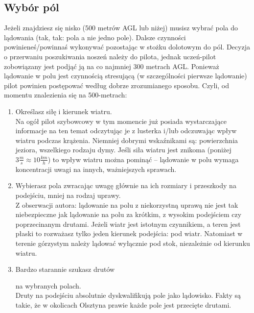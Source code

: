 \documentclass{article}
\begin{document}
\subsection{Wybór pól}
Jeżeli znajdziesz się nisko (500 metrów AGL lub niżej) musisz wybrać pola
do lądowania (tak, tak: pola a nie jedno pole).
Dalsze czynności powinieneś/powinnaś
wykonywać pozostając w stożku dolotowym do pól. Decyzja o przerwaniu
poszukiwania noszeń należy do pilota, jednak uczeń-pilot zobowiązany jest
podjąć ją na co najmniej 300 metrach AGL. Ponieważ lądowanie w polu 
jest czynnością stresującą (w szczególności pierwsze lądowanie)
pilot powinien postępować według dobrze zrozumianego
sposobu. Czyli, od momentu znalezienia się na 500-metrach:
\begin{enumerate}
\item Określasz siłę i kierunek wiatru. \\
    Na ogół pilot szybowcowy w tym momencie już posiada
    wystarczające informacje na ten temat odczytując je z lusterka i/lub
    odczuwając wpływ wiatru podczas krążenia. Niemniej dobrymi wskaźnikami są:
    powierzchnia jeziora, wszelkiego rodzaju dymy. Jeśli siła wiatru jest
    znikoma (poniżej $3\frac{m}{s} \approx 10\frac{km}{h}$) to wpływ
    wiatru można pominąć -- lądowanie w polu wymaga koncentracji uwagi
    na innych, ważniejszych sprawach.

\item Wybierasz pola zwracając uwagę głównie na ich rozmiary i przeszkody na
    podejściu, mniej na rodzaj uprawy.\\
    Z obserwacji autora: lądowanie
    na polu z niekorzystną uprawą nie jest tak niebezpieczne jak lądowanie
    na polu za krótkim, z wysokim podejściem czy poprzecinanym drutami.
    Jeżeli wiatr jest istotnym czynnikiem, a teren jest płaski
    to rozważasz tylko jeden kierunek podejścia: pod wiatr. Natomiast
    w terenie górzystym należy lądować wyłącznie pod stok, niezależnie
    od kierunku wiatru.

\item \begin{bf}Bardzo starannie szukasz drutów\end{bf} na wybranych
    polach.\\
    Druty na podejściu absolutnie dyskwalifikują pole jako lądowisko.
    Fakty są takie, że w okolicach Olsztyna prawie każde pole jest
    przecięte drutami.


\end{enumerate}
\end{document}
